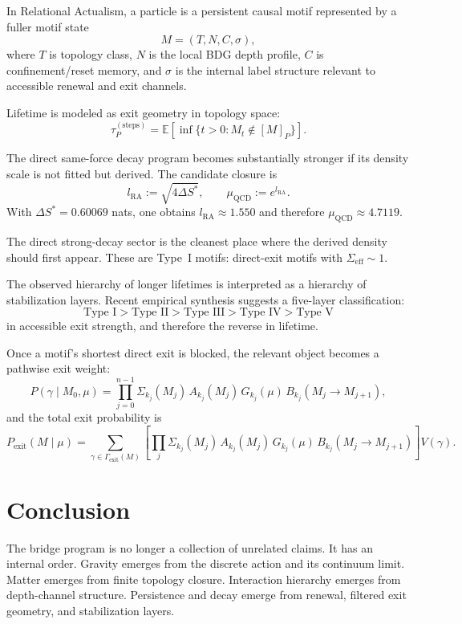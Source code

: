 \documentclass[11pt]{article}
\begin{document}
In Relational Actualism, a particle is a persistent causal motif represented by a fuller motif state
\[
M=(T,N,C,\sigma),
\]
where $T$ is topology class, $N$ is the local BDG depth profile, $C$ is confinement/reset memory, and $\sigma$ is the internal label structure relevant to accessible renewal and exit channels.

Lifetime is modeled as exit geometry in topology space:
\[
\tau_P^{(\mathrm{steps})}
=
\mathbb E\!\left[\inf\{t>0:M_t\notin [M]_P\}\right].
\]

The direct same-force decay program becomes substantially stronger if its density scale is not fitted but derived. The candidate closure is
\[
l_{\mathrm{RA}}:=\sqrt{4\Delta S^*}, \qquad
\mu_{\mathrm{QCD}}:=e^{l_{\mathrm{RA}}}.
\]
With $\Delta S^*=0.60069$ nats, one obtains $l_{\mathrm{RA}}\approx 1.550$ and therefore $\mu_{\mathrm{QCD}}\approx 4.7119$.

The direct strong-decay sector is the cleanest place where the derived density should first appear. These are Type~I motifs: direct-exit motifs with $\Sigma_{\mathrm{eff}}\sim 1$.

The observed hierarchy of longer lifetimes is interpreted as a hierarchy of stabilization layers. Recent empirical synthesis suggests a five-layer classification:
\[
\text{Type I} > \text{Type II} > \text{Type III} > \text{Type IV} > \text{Type V}
\]
in accessible exit strength, and therefore the reverse in lifetime.

Once a motif's shortest direct exit is blocked, the relevant object becomes a pathwise exit weight:
\[
P(\gamma\mid M_0,\mu)
=
\prod_{j=0}^{n-1}
\Sigma_{k_j}(M_j)\,
A_{k_j}(M_j)\,
G_{k_j}(\mu)\,
B_{k_j}(M_j\to M_{j+1}),
\]
and the total exit probability is
\[
P_{\mathrm{exit}}(M\mid\mu)
=
\sum_{\gamma\in\Gamma_{\mathrm{exit}}(M)}
\left[
\prod_{j}
\Sigma_{k_j}(M_j)\,
A_{k_j}(M_j)\,
G_{k_j}(\mu)\,
B_{k_j}(M_j\to M_{j+1})
\right]V(\gamma).
\]

\section{Conclusion}
The bridge program is no longer a collection of unrelated claims. It has an internal order. Gravity emerges from the discrete action and its continuum limit. Matter emerges from finite topology closure. Interaction hierarchy emerges from depth-channel structure. Persistence and decay emerge from renewal, filtered exit geometry, and stabilization layers.



\end{document}
